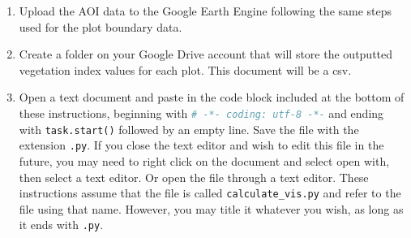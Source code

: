 \documentclass{article}
\begin{document}
\begin{enumerate}
  \item Upload the AOI data to the Google Earth Engine following the same steps used for the plot boundary data. 

  \item Create a folder on your Google Drive account that will store the outputted vegetation index values for each plot. This document will be a csv. 

  \item Open a text document and paste in the code block included at the bottom of these instructions, beginning with \lstinline[language=Python]{# -*- coding: utf-8 -*-} and ending with \lstinline[language=Python]{task.start()} followed by an empty line. Save the file with the extension \lstinline[language=Python]{.py}. If you close the text editor and wish to edit this file in the future, you may need to right click on the document and select open with, then select a text editor. Or open the file through a text editor. These instructions assume that the file is called \lstinline[language=Python]{calculate_vis.py} and refer to the file using that name. However, you may title it whatever you wish, as long as it ends with \lstinline[language=Python]{.py}.


\end{enumerate}
\end{document}
